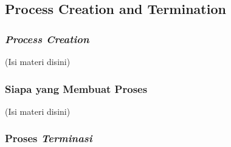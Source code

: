\documentclass[12pt]{article}
\begin{document}
\subsection{Process Creation and Termination}
\subsubsection{\textit{Process Creation}}
(Isi materi disini)

\subsubsection{Siapa yang Membuat Proses}
(Isi materi disini)

\subsubsection{Proses \textit{Terminasi}}
\end{document}
